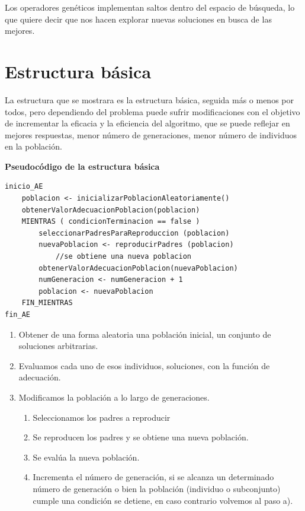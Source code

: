 \documentclass[12pt, twoside, openright]{report} %
\begin{document}
Los operadores genéticos implementan saltos dentro del espacio de búsqueda, lo que quiere decir que nos hacen explorar nuevas soluciones en busca de las mejores.

\section{Estructura básica}
La estructura que se mostrara es la estructura básica, seguida más o menos por todos, pero dependiendo del problema puede sufrir modificaciones con el objetivo de incrementar la eficacia y la eficiencia del algoritmo, que se puede reflejar en mejores respuestas, menor número de generaciones, menor número de individuos en la población.

\textbf{Pseudocódigo de la estructura básica}
\begin{lstlisting}
inicio_AE
	poblacion <- inicializarPoblacionAleatoriamente()
	obtenerValorAdecuacionPoblacion(poblacion)
	MIENTRAS ( condicionTerminacion == false )
		seleccionarPadresParaReproduccion (poblacion)
		nuevaPoblacion <- reproducirPadres (poblacion)
			//se obtiene una nueva poblacion
		obtenerValorAdecuacionPoblacion(nuevaPoblacion)
		numGeneracion <- numGeneracion + 1
		poblacion <- nuevaPoblacion
  	FIN_MIENTRAS
fin_AE
\end{lstlisting}
\begin{enumerate}
	\item Obtener de una forma aleatoria una población inicial, un conjunto de soluciones arbitrarias.
	\item Evaluamos cada uno de esos individuos, soluciones, con la función de adecuación.
	\item Modificamos la población a lo largo de generaciones.
	      \begin{enumerate}
		      \item Seleccionamos los padres a reproducir
		      \item Se reproducen los padres y se obtiene una nueva población.
		      \item Se evalúa la nueva población.
		      \item Incrementa el número de generación, si se alcanza un determinado número de generación o bien la población (individuo o subconjunto) cumple una condición se detiene, en caso contrario volvemos al paso a).
	      \end{enumerate}
\end{enumerate}
\end{document}
